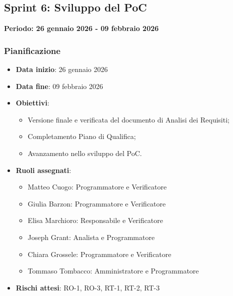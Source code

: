\documentclass[11pt,a4paper]{article}
\begin{document}
\subsection{Sprint 6: Sviluppo del PoC}
{\textbf{Periodo: 26 gennaio 2026 - 09 febbraio 2026}\par}

\subsubsection{Pianificazione}
\begin{itemize}
    \item \textbf{Data inizio}: 26 gennaio 2026
    \item \textbf{Data fine}: 09 febbraio 2026
    \item \textbf{Obiettivi}:
    \begin{itemize}
        \item Versione finale e verificata del documento di Analisi dei Requisiti;
        \item Completamento Piano di Qualifica;
        \item Avanzamento nello sviluppo del PoC.
    \end{itemize}
    \item \textbf{Ruoli assegnati}:
    \begin{itemize}
        \item Matteo Cuogo: Programmatore e Verificatore 
        \item Giulia Barzon: Programmatore e Verificatore
        \item Elisa Marchioro: Responsabile e Verificatore
        \item Joseph Grant: Analista e Programmatore
        \item Chiara Grossele: Programmatore e Verificatore
        \item Tommaso Tombacco: Amministratore e Programmatore 
    \end{itemize}
    \item \textbf{Rischi attesi}: RO-1, RO-3, RT-1, RT-2, RT-3
\end{itemize}
\end{document}
